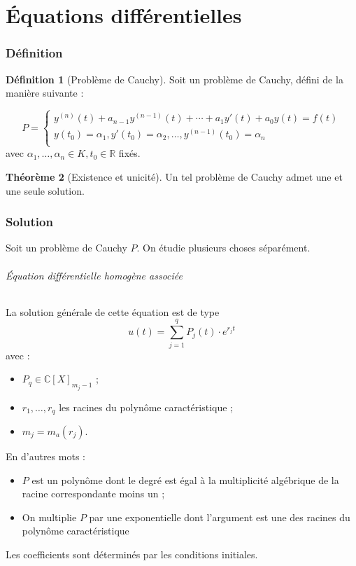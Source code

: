 \documentclass[11pt,a4paper]{article}
\theoremstyle{definition}
\newtheorem{mydef}{Définition}[section]
\newtheorem{mytheo}[mydef]{Théorème}
\newcommand{\R}{\mathbb{R}}
\newcommand{\C}{\mathbb{C}}
\begin{document}
\part{Équations différentielles}

\section{Définition}

\begin{mydef}[Problème de Cauchy]
Soit un problème de Cauchy, défini de la manière suivante :

\[ P = \left\{ \begin{array}{l}
y^{(n)}(t) + a_{n-1}y^{(n-1)}(t) + \cdots + a_1 y'(t) + a_0 y(t) = f(t) \\
y(t_0) = \alpha_1, y'(t_0) = \alpha_2, \dots , y^{(n-1)}(t_0) = \alpha_n \\ \end{array} \right. \]
avec $\alpha_1, \dots, \alpha_n \in K, t_0 \in \R$ fixés.

\end{mydef}

\begin{mytheo}[Existence et unicité]
Un tel problème de Cauchy admet une et une seule solution.
\end{mytheo}

\section{Solution}

Soit un problème de Cauchy $P$. On étudie plusieurs choses séparément.

\paragraph{Équation différentielle homogène associée}
La solution générale de cette équation est de type
\[ u(t) = \sum_{j=1}^{q} P_j(t) \cdot e^{r_j t} \]
avec :
\begin{itemize}
\item $P_q \in \C[X]_{m_j -1}$ ;
\item $r_1, \dots, r_q$ les racines du polynôme caractéristique ;
\item $m_j = m_a(r_j)$.
\end{itemize}
En d'autres mots :
\begin{itemize}
\item $P$ est un polynôme dont le degré est égal à la multiplicité algébrique de la racine correspondante moins un ;
\item On multiplie $P$ par une exponentielle dont l'argument est une des racines du polynôme caractéristique
\end{itemize}
Les coefficients sont déterminés par les conditions initiales.
\end{document}
